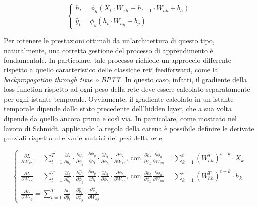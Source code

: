     \begin{equation}
        \begin{cases}
            h_{t} = \phi_{h}(X_{t} \cdot W_{xh} + h_{t-1} \cdot W_{hh} + b_{h}) \\[0.35cm]
            \hat{y}_{t} = \phi_{y}(h_{t} \cdot W_{hy} + b_{y})
        \end{cases}
        \label{eq:RNN}
    \end{equation} 

Per ottenere le prestazioni ottimali da un'architettura di questo tipo, naturalmente, una corretta gestione del processo di apprendimento è fondamentale. In particolare, tale processo richiede un approccio differente rispetto a quello caratteristico delle classiche reti feedforward, come la \emph{backpropagation through time o BPTT}. In questo caso, infatti, il gradiente della loss function rispetto ad ogni peso della rete deve essere calcolato separatamente per ogni istante temporale. Ovviamente, il gradiente calcolato in un istante temporale dipende dallo stato precedente dell'hidden layer, che a sua volta dipende da quello ancora prima e così via. In particolare, come mostrato nel lavoro di Schmidt, applicando la regola della catena è possibile definire le derivate parziali rispetto alle varie matrici dei pesi della rete:

\vspace{-14pt}

    \begin{equation}
        \begin{cases}
            \displaystyle \frac{\partial L}{\partial W_{xh}} = \sum_{t=1}^{T} \frac{\partial l_{t}}{\partial \hat{y}_{t}} \cdot \frac{\partial \hat{y}_{t}}{\partial \phi_{y}} \cdot \frac{\partial \phi_{y}}{\partial h_{t}} \cdot \frac{\partial h_{t}}{\partial \phi_{h}} \cdot \frac{\partial \phi_{h}}{\partial W_{xh}}\text{,     con  } \frac{\partial h_{t}}{\partial \phi_{h}} \frac{\partial \phi_{h}}{\partial W_{xh}} = \sum_{k=1}^{t} (W_{hh}^{T})^{t-k} \cdot X_{k} \\[0.40cm]

            \displaystyle \frac{\partial L}{\partial W_{hh}} = \sum_{t=1}^{T} \frac{\partial l_{t}}{\partial \hat{y}_{t}} \cdot \frac{\partial \hat{y}_{t}}{\partial \phi_{y}} \cdot \frac{\partial \phi_{y}}{\partial h_{t}} \cdot \frac{\partial h_{t}}{\partial \phi_{h}} \cdot \frac{\partial \phi_{h}}{\partial W_{hh}}\text{,     con  } \frac{\partial h_{t}}{\partial \phi_{h}} \frac{\partial \phi_{h}}{\partial W_{hh}} = \sum_{k=1}^{t} (W_{hh}^{T})^{t-k} \cdot h_{k} \\[0.40cm]

            \displaystyle \frac{\partial L}{\partial W_{hy}} = \sum_{t=1}^{T} \frac{\partial l_{t}}{\partial \hat{y}_{t}} \cdot \frac{\partial \hat{y}_{t}}{\partial \phi_{y}} \cdot \frac{\partial \phi_{y}}{\partial W_{hy}}
        \end{cases}
        \label{eq:BPTT}
    \end{equation}

